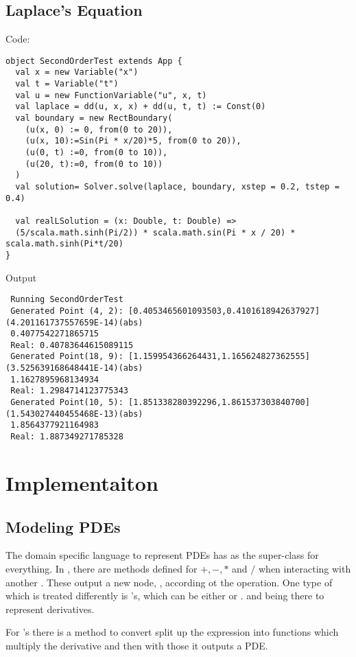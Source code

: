 \subsection{Laplace's Equation}
Code:
\begin{verbatim}
object SecondOrderTest extends App {
  val x = new Variable("x")
  val t = Variable("t")
  val u = new FunctionVariable("u", x, t)
  val laplace = dd(u, x, x) + dd(u, t, t) := Const(0)
  val boundary = new RectBoundary(
    (u(x, 0) := 0, from(0 to 20)),
    (u(x, 10):=Sin(Pi * x/20)*5, from(0 to 20)),
    (u(0, t) :=0, from(0 to 10)),
    (u(20, t):=0, from(0 to 10))
  )
  val solution= Solver.solve(laplace, boundary, xstep = 0.2, tstep = 0.4)

  val realLSolution = (x: Double, t: Double) =>
  (5/scala.math.sinh(Pi/2)) * scala.math.sin(Pi * x / 20) * scala.math.sinh(Pi*t/20)
}
\end{verbatim}
Output
\begingroup
\fontsize{10pt}{12pt}
\begin{verbatim}
 Running SecondOrderTest
 Generated Point (4, 2): [0.4053465601093503,0.4101618942637927]  (4.201161737557659E-14)(abs)
 0.4077542271865715
 Real: 0.40783644615089115
 Generated Point(18, 9): [1.159954366264431,1.165624827362555]  (3.525639168648441E-14)(abs)
 1.1627895968134934
 Real: 1.2984714123775343
 Generated Point(10, 5): [1.851338280392296,1.861537303840700]  (1.543027440455468E-13)(abs)
 1.8564377921164983
 Real: 1.887349271785328
\end{verbatim}
\endgroup
\section{Implementaiton}
\subsection{Modeling PDEs}
The domain specific language to represent PDEs has 
as the super-class for everything. In , there are
methods defined for $+, -, *$ and $/$ when interacting with another
.  These output a new node, , according ot the operation. One type of 
which is treated differently is 's, which can
be either  or .  and
 being there to represent derivatives.

For 's there is a method \verba{:=} to convert split
up the expression into functions which multiply the derivative and
then with those it outputs a PDE.

